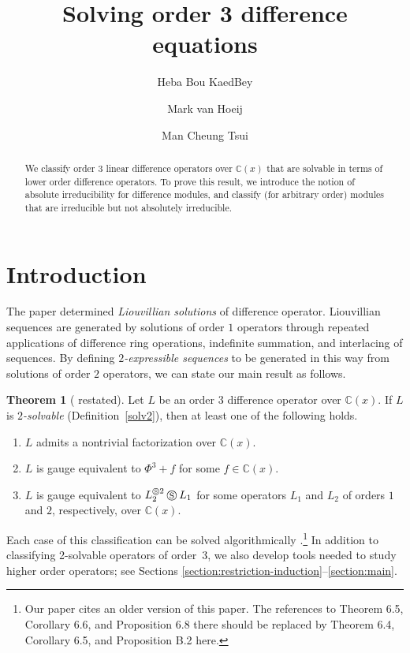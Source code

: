 \documentclass[11pt,reqno]{amsart}
\title{Solving order 3 difference equations}
\author{Heba Bou KaedBey}
\author{Mark van Hoeij}
\author{Man Cheung Tsui}
\theoremstyle{definition}
\newtheorem*{theorem*}{Theorem}
\newcommand{\cs}{\mathbin{\circledS}}
\begin{document}
\begin{abstract}
    We classify order $3$ linear difference operators over $\mathbb{C}(x)$ that are solvable in terms of lower order difference operators. 
    To prove this result, we introduce the notion of absolute irreducibility for difference modules, and classify (for arbitrary order) modules that are irreducible but not absolutely irreducible.
\end{abstract}
\maketitle

\section{Introduction}
\label{section:introduction}

The paper \cite{hendricks1999solving} determined \emph{Liouvillian solutions}
of difference operator. Liouvillian sequences are generated by solutions of order $1$ operators
through repeated applications of difference ring operations, indefinite summation, and interlacing of sequences.
By defining \emph{$2$-expressible sequences} 
to be generated in this way from solutions of order $2$ operators, we can state our main result as follows.

\begin{theorem*}[ restated]
    Let $L$ be an order $3$ difference operator over $\mathbb{C}(x)$.
    If $L$ is \emph{$2$-solvable} (Definition~\ref{solv2}), %
    then at least one of the following holds.
    \begin{enumerate}[label=(\alph*)]
        \item $L$ admits a nontrivial factorization over $\mathbb{C}(x)$.
        \item $L$ is gauge equivalent to $\Phi^{3}+f$ for some $f\in \mathbb{C}(x)$.
        \item $L$ is gauge equivalent to $L_{2}^{\cs 2}\cs L_{1}$ for some operators $L_{1}$ and $L_{2}$ of orders $1$ and $2$, respectively, over $\mathbb{C}(x)$.
    \end{enumerate}
\end{theorem*}

Each case of this classification can be solved algorithmically \cite{bou2024solving}.\footnote{Our paper \cite{bou2024solving} cites an older version of this paper. The references to Theorem 6.5, Corollary 6.6, and Proposition 6.8 there should be replaced by Theorem 6.4, Corollary 6.5, and Proposition B.2 here.}
In addition to classifying 2-solvable operators of order~3, we also develop tools needed to study higher order operators; see Sections \ref{section:restriction-induction}--\ref{section:main}.
\end{document}
